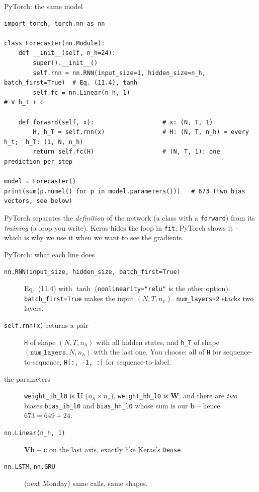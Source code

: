 \documentclass[10pt,aspectratio=169]{beamer}
\begin{document}
\begin{frame}[fragile]{PyTorch: the same model}
\begin{lstlisting}
import torch, torch.nn as nn

class Forecaster(nn.Module):
    def __init__(self, n_h=24):
        super().__init__()
        self.rnn = nn.RNN(input_size=1, hidden_size=n_h, batch_first=True)  # Eq. (11.4), tanh
        self.fc = nn.Linear(n_h, 1)                                         # V h_t + c

    def forward(self, x):                   # x: (N, T, 1)
        H, h_T = self.rnn(x)                # H: (N, T, n_h) = every h_t;  h_T: (1, N, n_h)
        return self.fc(H)                   # (N, T, 1): one prediction per step

model = Forecaster()
print(sum(p.numel() for p in model.parameters()))   # 673 (two bias vectors, see below)
\end{lstlisting}
\small
PyTorch separates the \emph{definition} of the network (a class with a
\texttt{forward}) from its \emph{training} (a loop you write).  Keras hides
the loop in \texttt{fit}; PyTorch shows it -- which is why we use it when we
want to see the gradients.
\end{frame}

\begin{frame}{PyTorch: what each line does}
\small
\begin{description}
  \item[\texttt{nn.RNN(input\_size, hidden\_size, batch\_first=True)}]
        Eq.~(11.4) with $\tanh$ (\texttt{nonlinearity="relu"} is the other
        option).  \texttt{batch\_first=True} makes the input $(N,T,n_x)$.
        \texttt{num\_layers=2} stacks two layers.
  \item[\texttt{self.rnn(x)} returns a pair] \texttt{H} of shape $(N,T,n_h)$
        with all hidden states, and \texttt{h\_T} of shape
        $(\texttt{num\_layers},N,n_h)$ with the last one.  You choose: all of
        \texttt{H} for sequence-to-sequence, \texttt{H[:, -1, :]} for
        sequence-to-label.
  \item[the parameters] \texttt{weight\_ih\_l0} is $\bm{U}$ ($n_h\times n_x$),
        \texttt{weight\_hh\_l0} is $\bm{W}$, and there are \emph{two} biases
        \texttt{bias\_ih\_l0} and \texttt{bias\_hh\_l0} whose sum is our
        $\bm{b}$ -- hence $673=649+24$.
  \item[\texttt{nn.Linear(n\_h, 1)}] $\bm{V}\bm{h}+\bm{c}$ on the last axis,
        exactly like Keras's \texttt{Dense}.
  \item[\texttt{nn.LSTM}, \texttt{nn.GRU}] (next Monday) same calls, same
        shapes.
\end{description}
\end{frame}
\end{document}
